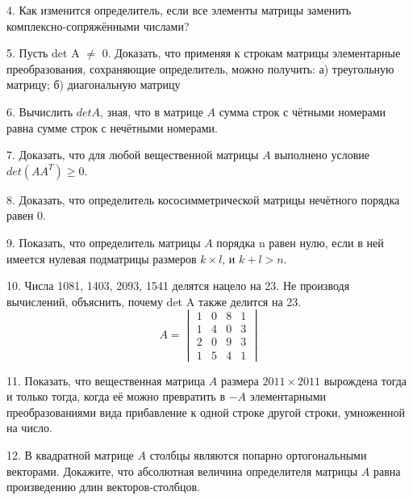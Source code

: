 \documentclass[12pt]{article}
\begin{document}
4. Как изменится определитель, если все элементы матрицы заменить комплексно-сопряжёнными числами?

5. Пусть det A $\neq$ 0. Доказать, что применяя к строкам матрицы элементарные преобразования, сохраняющие определитель, можно получить:
а) треугольную матрицу; б) диагональную матрицу

6. Вычислить $det A$, зная, что в матрице $A$ сумма строк с чётными номерами равна сумме строк с нечётными номерами.

7. Доказать, что для любой вещественной матрицы $A$ выполнено условие $det(AA^T) \ge 0$.

8. Доказать, что определитель кососимметрической матрицы нечётного порядка равен 0.

9. Показать, что определитель матрицы $A$ порядка n равен нулю, если в ней имеется нулевая подматрицы размеров $k \times l$, и $k + l > n$.

10. Числа 1081, 1403, 2093, 1541 делятся нацело на 23. Не производя вычислений, объяснить, почему det A также делится на 23.
\[
A = \begin{vmatrix}
1 & 0 & 8 & 1\\
1 & 4 & 0 & 3\\
2 & 0 & 9 & 3\\
1 & 5 & 4 & 1
\end{vmatrix}
\]

11. Показать, что вещественная матрица $A$ размера $2011 \times 2011$ вырождена тогда и только тогда, когда её можно превратить в $-A$ элементарными преобразованиями вида прибавление к одной строке другой строки, умноженной на число.

12. В квадратной матрице $A$ столбцы являются попарно ортогональными векторами. Докажите, что абсолютная величина определителя матрицы $A$ равна произведению длин векторов-столбцов.
\end{document}
